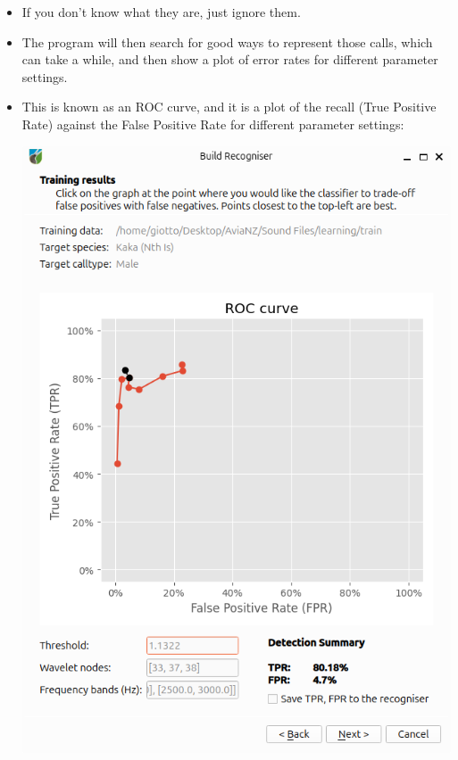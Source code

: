 \documentclass{article}
\begin{document}
\begin{itemize}
\item If you don't know what they are, just ignore them. 
\item The program will then search for good ways to represent those calls, which can take a while, and then show a plot of error rates for different parameter settings. 
\item This is known as an ROC curve, and it is a plot of the recall (True Positive Rate) against the False Positive Rate for different parameter settings:
\begin{center}
    \includegraphics[width=.7\textwidth]{Figures/BuildRecogniser4}
\end{center}


\end{itemize}
\end{document}
